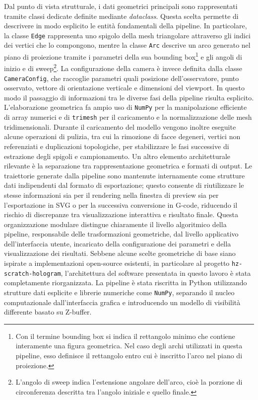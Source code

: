 \documentclass[a4paper,11pt,titlepage,twoside]{book}
\newcommand{\1}{\mathbf{1}}
\numberwithin{equation}{chapter}
\theoremstyle{plain}
\theoremstyle{definition}
\begin{document}
	Dal punto di vista strutturale, i dati geometrici principali sono rappresentati tramite classi dedicate definite mediante \textit{dataclass}. Questa scelta permette di descrivere in modo esplicito le entità fondamentali della pipeline. In particolare, la classe \texttt{Edge} rappresenta uno spigolo della mesh triangolare attraverso gli indici dei vertici che lo compongono, mentre la classe \texttt{Arc} descrive un arco generato nel piano di proiezione tramite i parametri della sua bounding box\footnote{Con il termine bounding box si indica il rettangolo minimo che contiene interamente una figura geometrica. Nel caso degli archi utilizzati in questa pipeline, esso definisce il rettangolo entro cui è inscritto l’arco nel piano di proiezione.} e gli angoli di inizio e di sweep\footnote{L’angolo di sweep indica l’estensione angolare dell’arco, cioè la porzione di circonferenza descritta tra l’angolo iniziale e quello finale.}. La configurazione della camera è invece definita dalla classe \texttt{CameraConfig}, che raccoglie parametri quali posizione dell’osservatore, punto osservato, vettore di orientazione verticale e dimensioni del viewport. In questo modo il passaggio di informazioni tra le diverse fasi della pipeline risulta esplicito.
	L’elaborazione geometrica fa ampio uso di \texttt{NumPy} per la manipolazione efficiente di array numerici e di \texttt{trimesh} per il caricamento e la normalizzazione delle mesh tridimensionali. Durante il caricamento del modello vengono inoltre eseguite alcune operazioni di pulizia, tra cui la rimozione di facce degeneri, vertici non referenziati e duplicazioni topologiche, per stabilizzare le fasi successive di estrazione degli spigoli e campionamento.
	Un altro elemento architetturale rilevante è la separazione tra rappresentazione geometrica e formati di output. Le traiettorie generate dalla pipeline sono mantenute internamente come strutture dati indipendenti dal formato di esportazione; questo consente di riutilizzare le stesse informazioni sia per il rendering nella finestra di preview sia per l’esportazione in SVG o per la successiva conversione in G-code, riducendo il rischio di discrepanze tra visualizzazione interattiva e risultato finale.
	Questa organizzazione modulare distingue chiaramente il livello algoritmico della pipeline, responsabile delle trasformazioni geometriche, dal livello applicativo dell’interfaccia utente, incaricato della configurazione dei parametri e della visualizzazione dei risultati.
	Sebbene alcune scelte geometriche di base siano ispirate a implementazioni open-source esistenti, in particolare al progetto \texttt{hz-scratch-hologram}, l’architettura del software presentata in questo lavoro è stata completamente riorganizzata. La pipeline è stata riscritta in Python utilizzando strutture dati esplicite e librerie numeriche come \texttt{NumPy}, separando il nucleo computazionale dall’interfaccia grafica e introducendo un modello di visibilità differente basato su Z-buffer.
	
\end{document}

